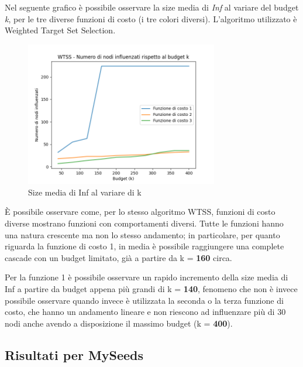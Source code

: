 Nel seguente grafico è possibile osservare la size media di \textit{Inf} al variare del budget \textit{k}, per le tre diverse funzioni di costo (i tre colori diversi). L'algoritmo utilizzato è Weighted Target Set Selection.

\begin{figure}[hbtp]
    \centering
    \includegraphics[width=0.75\textwidth]{images/wtss.png}
    \caption*{Size media di Inf al variare di k}
    \label{fig:third}
\end{figure}

È possibile osservare come, per lo stesso algoritmo WTSS, funzioni di costo diverse mostrano funzioni con comportamenti diversi. Tutte le funzioni hanno una natura crescente ma non lo stesso andamento; in particolare, per quanto riguarda la funzione di costo 1, in media è possibile raggiungere una complete cascade con un budget limitato, già a partire da k = \textbf{160} circa. 

Per la funzione 1 è possibile osservare un rapido incremento della size media di Inf a partire da budget appena più grandi di k = \textbf{140}, fenomeno che non è invece possibile osservare quando invece è utilizzata la seconda o la terza funzione di costo, che hanno un andamento lineare e non riescono ad influenzare più di 30 nodi anche avendo a disposizione il massimo budget (k = \textbf{400}).

\subsection{Risultati per MySeeds}

